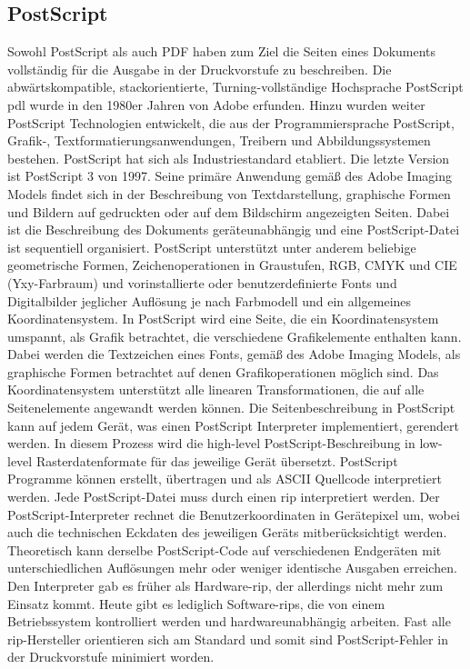 \subsection{PostScript}
Sowohl PostScript als auch PDF haben zum Ziel die Seiten eines Dokuments vollständig für die Ausgabe in der Druckvorstufe zu beschreiben. Die abwärtskompatible, stackorientierte, Turning-vollständige Hochsprache PostScript \gls{pdl} wurde in den 1980er Jahren von Adobe erfunden. \cite{adobe-postscript, wiki-postscript} Hinzu wurden weiter PostScript Technologien entwickelt, die aus der Programmiersprache PostScript, Grafik-, Textformatierungsanwendungen, Treibern und Abbildungssystemen bestehen. PostScript hat sich als Industriestandard etabliert. Die letzte Version ist PostScript 3 von 1997. Seine primäre Anwendung gemäß des Adobe Imaging Models findet sich in der Beschreibung von Textdarstellung, graphische Formen und Bildern auf gedruckten oder auf dem Bildschirm angezeigten Seiten. Dabei ist die Beschreibung des Dokuments geräteunabhängig und eine PostScript-Datei ist sequentiell organisiert. PostScript unterstützt unter anderem beliebige geometrische Formen, Zeichenoperationen in Graustufen, RGB, CMYK und CIE (Yxy-Farbraum) und  vorinstallierte oder benutzerdefinierte Fonts und Digitalbilder jeglicher Auflösung je nach Farbmodell und ein allgemeines Koordinatensystem.
In PostScript wird eine Seite, die ein Koordinatensystem umspannt, als Grafik betrachtet, die verschiedene Grafikelemente enthalten kann. Dabei werden die Textzeichen eines Fonts, gemäß des Adobe Imaging Models, als graphische Formen betrachtet auf denen Grafikoperationen möglich sind. Das Koordinatensystem unterstützt alle linearen Transformationen, die auf alle Seitenelemente angewandt werden können. Die Seitenbeschreibung in PostScript kann auf jedem Gerät, was einen PostScript Interpreter implementiert, gerendert werden. In diesem Prozess wird die high-level PostScript-Beschreibung in low-level Rasterdatenformate für das jeweilige Gerät übersetzt. PostScript Programme können erstellt, übertragen und als ASCII Quellcode interpretiert werden. \cite{adobe-postscript} Jede PostScript-Datei muss durch einen \gls{rip} interpretiert werden. Der PostScript-Interpreter rechnet die Benutzerkoordinaten in Gerätepixel um, wobei auch die technischen Eckdaten des jeweiligen Geräts mitberücksichtigt werden. Theoretisch kann derselbe PostScript-Code auf verschiedenen Endgeräten mit unterschiedlichen Auflösungen mehr oder weniger identische Ausgaben erreichen. Den Interpreter gab es früher als Hardware-\gls{rip}, der allerdings nicht mehr zum Einsatz kommt. Heute gibt es lediglich Software-\gls{rip}s, die von einem Betriebssystem kontrolliert werden und hardwareunabhängig arbeiten. Fast alle \gls{rip}-Hersteller orientieren sich am Standard und somit sind PostScript-Fehler in der Druckvorstufe minimiert worden. 
\cite{schneeberger}

